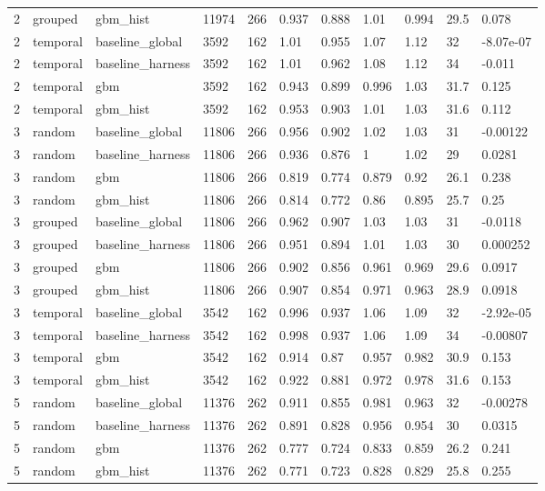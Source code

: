 \begin{tabular}{lllllllllll}
2 & grouped & gbm\_hist & 11974 & 266 & 0.937 & 0.888 & 1.01 & 0.994 & 29.5 & 0.078 \\
2 & temporal & baseline\_global & 3592 & 162 & 1.01 & 0.955 & 1.07 & 1.12 & 32 & -8.07e-07 \\
2 & temporal & baseline\_harness & 3592 & 162 & 1.01 & 0.962 & 1.08 & 1.12 & 34 & -0.011 \\
2 & temporal & gbm & 3592 & 162 & 0.943 & 0.899 & 0.996 & 1.03 & 31.7 & 0.125 \\
2 & temporal & gbm\_hist & 3592 & 162 & 0.953 & 0.903 & 1.01 & 1.03 & 31.6 & 0.112 \\
3 & random & baseline\_global & 11806 & 266 & 0.956 & 0.902 & 1.02 & 1.03 & 31 & -0.00122 \\
3 & random & baseline\_harness & 11806 & 266 & 0.936 & 0.876 & 1 & 1.02 & 29 & 0.0281 \\
3 & random & gbm & 11806 & 266 & 0.819 & 0.774 & 0.879 & 0.92 & 26.1 & 0.238 \\
3 & random & gbm\_hist & 11806 & 266 & 0.814 & 0.772 & 0.86 & 0.895 & 25.7 & 0.25 \\
3 & grouped & baseline\_global & 11806 & 266 & 0.962 & 0.907 & 1.03 & 1.03 & 31 & -0.0118 \\
3 & grouped & baseline\_harness & 11806 & 266 & 0.951 & 0.894 & 1.01 & 1.03 & 30 & 0.000252 \\
3 & grouped & gbm & 11806 & 266 & 0.902 & 0.856 & 0.961 & 0.969 & 29.6 & 0.0917 \\
3 & grouped & gbm\_hist & 11806 & 266 & 0.907 & 0.854 & 0.971 & 0.963 & 28.9 & 0.0918 \\
3 & temporal & baseline\_global & 3542 & 162 & 0.996 & 0.937 & 1.06 & 1.09 & 32 & -2.92e-05 \\
3 & temporal & baseline\_harness & 3542 & 162 & 0.998 & 0.937 & 1.06 & 1.09 & 34 & -0.00807 \\
3 & temporal & gbm & 3542 & 162 & 0.914 & 0.87 & 0.957 & 0.982 & 30.9 & 0.153 \\
3 & temporal & gbm\_hist & 3542 & 162 & 0.922 & 0.881 & 0.972 & 0.978 & 31.6 & 0.153 \\
5 & random & baseline\_global & 11376 & 262 & 0.911 & 0.855 & 0.981 & 0.963 & 32 & -0.00278 \\
5 & random & baseline\_harness & 11376 & 262 & 0.891 & 0.828 & 0.956 & 0.954 & 30 & 0.0315 \\
5 & random & gbm & 11376 & 262 & 0.777 & 0.724 & 0.833 & 0.859 & 26.2 & 0.241 \\
5 & random & gbm\_hist & 11376 & 262 & 0.771 & 0.723 & 0.828 & 0.829 & 25.8 & 0.255 \\

\end{tabular}

